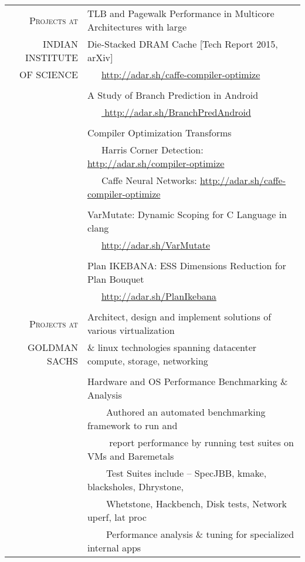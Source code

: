 \documentclass[a4paper,10pt]{article} %
\newcommand{\tabitem}{~~\llap{\textbullet}~~}
\begin{document}
\begin{tabular}{rp{12cm}}
\textsc{Projects at} & TLB and Pagewalk Performance in Multicore Architectures with large \\
\textsc{INDIAN INSTITUTE} & Die-Stacked DRAM Cache \hfill [Tech Report 2015, arXiv]\\
\textsc{OF SCIENCE} & ~~~\href{http://adar.sh/caffe-compiler-optimize}{http://adar.sh/caffe-compiler-optimize}\\
& \\
& A Study of Branch Prediction in Android \\
& ~~~\href{http://adar.sh/BranchPredAndroid}{ http://adar.sh/BranchPredAndroid} \\
& \\
& Compiler Optimization Transforms\\
& ~~~Harris Corner Detection: \href{http://adar.sh/compiler-optimize}{http://adar.sh/compiler-optimize}\\
& ~~~Caffe Neural Networks:  \href{http://adar.sh/caffe-compiler-optimize}{http://adar.sh/caffe-compiler-optimize}\\
& \\
& VarMutate: Dynamic Scoping for C Language in clang\\
& ~~~\href{http://adar.sh/VarMutate}{http://adar.sh/VarMutate} \\
& \\
& Plan IKEBANA: ESS Dimensions Reduction for Plan Bouquet \\
& ~~~\href{http://adar.sh/PlanIkebana}{http://adar.sh/PlanIkebana}\\
&\\
\textsc{Projects at}  &  Architect, design and implement solutions of various virtualization \\
\textsc{GOLDMAN SACHS} &   \& linux technologies spanning datacenter compute, storage, networking \\
&\\
& Hardware and OS Performance Benchmarking \& Analysis\\
& \tabitem Authored an automated benchmarking framework to run and \\
& ~~~~ report performance by running test suites on VMs and Baremetals\\
& \tabitem Test Suites include – SpecJBB, kmake, blacksholes, Dhrystone, \\
& ~~~~Whetstone, Hackbench, Disk tests, Network uperf, lat proc \\
& \tabitem Performance analysis \& tuning for specialized internal apps \\

\end{tabular}
\end{document}
